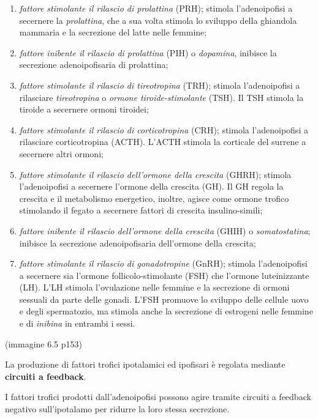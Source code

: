 \documentclass[]{article}
\begin{document}
\begin{enumerate}
\def\labelenumi{\arabic{enumi}.}
\itemsep1pt\parskip0pt
\item
  \emph{fattore stimolante il rilascio di prolattina} (PRH); stimola
  l'adenoipofisi a secernere la \emph{prolattina}, che a sua volta
  stimola lo sviluppo della ghiandola mammaria e la secrezione del latte
  nelle femmine;
\item
  \emph{fattore inibente il rilascio di prolattina} (PIH) o
  \emph{dopamina}, inibisce la secrezione adenoipofisaria di prolattina;
\item
  \emph{fattore stimolante il rilascio di tireotropina} (TRH); stimola
  l'adenoipofisi a rilasciare \emph{tireotropina} o \emph{ormone
  tiroide-stimolante} (TSH). Il TSH stimola la tiroide a secernere
  ormoni tiroidei;
\item
  \emph{fattore stimolante il rilascio di corticotropina} (CRH); stimola
  l'adenoipofisi a rilasciare corticotropina (ACTH). L'ACTH stimola la
  corticale del surrene a secernere altri ormoni;
\item
  \emph{fattore stimolante il rilascio dell'ormone della crescita}
  (GHRH); stimola l'adenoipofisi a secernere l'ormone della crescita
  (GH). Il GH regola la crescita e il metabolismo energetico, inoltre,
  agisce come ormone trofico stimolando il fegato a secernere fattori di
  crescita insulino-simili;
\item
  \emph{fattore inibente il rilascio dell'ormone della crescita} (GHIH)
  o \emph{somatostatina}; inibisce la secrezione adenoipofisaria
  dell'ormone della crescita;
\item
  \emph{fattore stimolante il rilascio di gonadotropine} (GnRH); stimola
  l'adenoipofisi a secernere sia l'ormone follicolo-stimolante (FSH) che
  l'ormone luteinizzante (LH). L'LH stimola l'ovulazione nelle femmine e
  la secrezione di ormoni sessuali da parte delle gonadi. L'FSH promuove
  lo sviluppo delle cellule uovo e degli spermatozio, ma stimola anche
  la secrezione di estrogeni nelle femmine e di \emph{inibina} in
  entrambi i sessi.
\end{enumerate}

(immagine 6.5 p153)

La produzione di fattori trofici ipotalamici ed ipofisari è regolata
mediante \textbf{circuiti a feedback}.

I fattori trofici prodotti dall'adenoipofisi possono agire tramite
circuiti a feedback negativo sull'ipotalamo per ridurre la loro stessa
secrezione.
\end{document}
